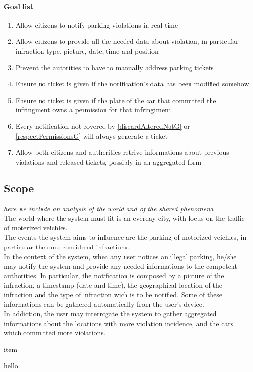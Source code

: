 \documentclass{article}
\newcommand{\enum}[1]{\texttt{#1.\arabic*}}
\begin{document}
\paragraph{Goal list}
\begin{enumerate}[label=\enum{G}]
	\item  Allow citizens to notify parking violations in real time
	\item Allow citizens to provide all the needed data about violation, in particular infraction type, picture, date, time and position
	\item Prevent the autorities to have to manually address parking tickets
	\item \label{discardAlteredNotG} Ensure no ticket is given if the notification's data has been modified somehow
	\item \label{respectPermissionsG} Ensure no ticket is given if the plate of the car that committed the infringment owns a permission for that infringiment
	\item Every notification not covered by \ref{discardAlteredNotG} or \ref{respectPermissionsG} will always generate a ticket
	\item Allow both citizens and authorities retrive informations about previous violations and released tickets, possibly in an aggregated form 
\end{enumerate}

	\subsection{Scope} \textit{here we include an analysis of the world and of the shared phenomena}\\
	The world where the system must fit is an everday city, with focus on the traffic of moterized veichles.\\
	The events the system aims to influence are the parking of motorized veichles,  in particular the ones considered infractions.\\
	In the context of the system, when any user notices an illegal parking, he/she may notify the system and provide any needed informations to the competent authorities. In particular, the notification is composed by a picture of the infraction, a timestamp (date and time), the geographical location of the infraction and the type of infraction wich is to be notified. Some of these informations can be gathered automatically from the user's device.\\
	In addiction, the user may interrogate the system to gather aggregated informations about the locations with more violation incidence, and the cars which committed more violations. 
	\begin{list}{-}{World phenomena}
		\item item
	\end{list}
	\begin{list}{-}{Shared phenomena}
		\item hello
	\end{list}
\end{document}
